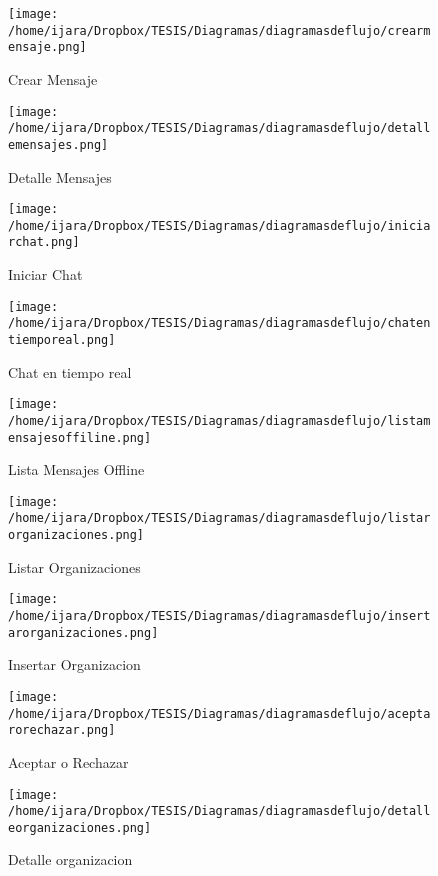 \documentclass[letterpaper,openright,10pt,oneside]{report}
\begin{document}
\begin{figure}[htp]
\centering
\texttt{[image: /home/ijara/Dropbox/TESIS/Diagramas/diagramasdeflujo/crearmensaje.png]}
\caption{Crear Mensaje}
\label{}
\end{figure}
\begin{figure}[htp]
\centering
\texttt{[image: /home/ijara/Dropbox/TESIS/Diagramas/diagramasdeflujo/detallemensajes.png]}
\caption{Detalle Mensajes}
\label{}
\end{figure}
\begin{figure}[htp]
\centering
\texttt{[image: /home/ijara/Dropbox/TESIS/Diagramas/diagramasdeflujo/iniciarchat.png]}
\caption{Iniciar Chat}
\label{}
\end{figure}
\begin{figure}[htp]
\centering
\texttt{[image: /home/ijara/Dropbox/TESIS/Diagramas/diagramasdeflujo/chatentiemporeal.png]}
\caption{Chat en tiempo real}
\label{}
\end{figure}
\begin{figure}[htp]
\centering
\texttt{[image: /home/ijara/Dropbox/TESIS/Diagramas/diagramasdeflujo/listamensajesoffiline.png]}
\caption{Lista Mensajes Offline}
\label{}
\end{figure}
\begin{figure}[htp]
\centering
\texttt{[image: /home/ijara/Dropbox/TESIS/Diagramas/diagramasdeflujo/listarorganizaciones.png]}
\caption{Listar Organizaciones}
\label{}
\end{figure}
\begin{figure}[htp]
\centering
\texttt{[image: /home/ijara/Dropbox/TESIS/Diagramas/diagramasdeflujo/insertarorganizaciones.png]}
\caption{Insertar Organizacion}
\label{}
\end{figure}
\begin{figure}[htp]
\centering
\texttt{[image: /home/ijara/Dropbox/TESIS/Diagramas/diagramasdeflujo/aceptarorechazar.png]}
\caption{Aceptar o Rechazar}
\label{}
\end{figure}
\begin{figure}[htp]
\centering
\texttt{[image: /home/ijara/Dropbox/TESIS/Diagramas/diagramasdeflujo/detalleorganizaciones.png]}
\caption{Detalle organizacion}
\label{}
\end{figure}
\end{document}
